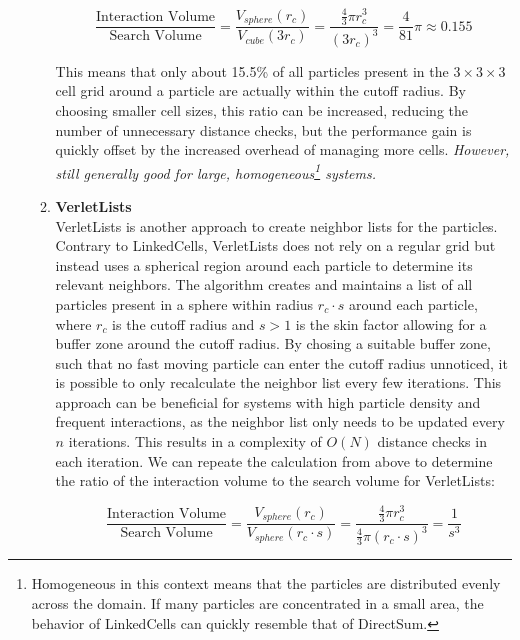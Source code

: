 \begin{enumerate}[label=\textbf{\arabic*.}]
\begin{enumerate}
                        \begin{equation}
                              \frac{\text{Interaction Volume}}{\text{Search Volume}} =
                              \frac{V_{sphere}(r_c)}{V_{cube}(3r_c)} = \frac{\frac{4}{3}\pi r_c^3}{(3r_c)^3} = \frac{4}{81}\pi \approx 0.155
                        \end{equation}

                        This means that only about 15.5\% of all particles present in the $3\times3\times3$ cell grid around a particle are actually within the cutoff radius. By choosing smaller cell sizes, this ratio can be increased, reducing the number of unnecessary distance checks, but the performance gain is quickly offset by the increased overhead of managing more cells. 
                        \textit{However, still generally good for large, homogeneous\footnote{Homogeneous in this context means that the particles are distributed evenly across the domain. If many particles are concentrated in a small area, the behavior of LinkedCells can quickly resemble that of DirectSum.} systems.}

                  \item \textbf{VerletLists} \\
                        VerletLists is another approach to create neighbor lists for the particles. Contrary to LinkedCells, VerletLists does not rely on a regular grid but instead uses a spherical region around each particle to determine its relevant neighbors.
                        The algorithm creates and maintains a list of all particles present in a sphere within radius $r_c \cdot s$ around each particle, where $r_c$ is the cutoff radius and $s>1$ is the skin factor allowing for a buffer zone around the cutoff radius.
                        By chosing a suitable buffer zone, such that no fast moving particle can enter the cutoff radius unnoticed, it is possible to only recalculate the neighbor list every few iterations. This approach can be beneficial for systems with high particle density and frequent interactions, as the neighbor list only needs to be updated every $n$ iterations. This results in a complexity of $O(N)$ distance checks in each iteration.
                        We can repeate the calculation from above to determine the ratio of the interaction volume to the search volume for VerletLists:

                        \begin{equation}
                              \frac{\text{Interaction Volume}}{\text{Search Volume}} =
                              \frac{V_{sphere}(r_c)}{V_{sphere}(r_c \cdot s)} = \frac{\frac{4}{3}\pi r_c^3}{\frac{4}{3}\pi (r_c \cdot s)^3} = \frac{1}{s^3}
                        \end{equation}


\end{enumerate}
\end{enumerate}
